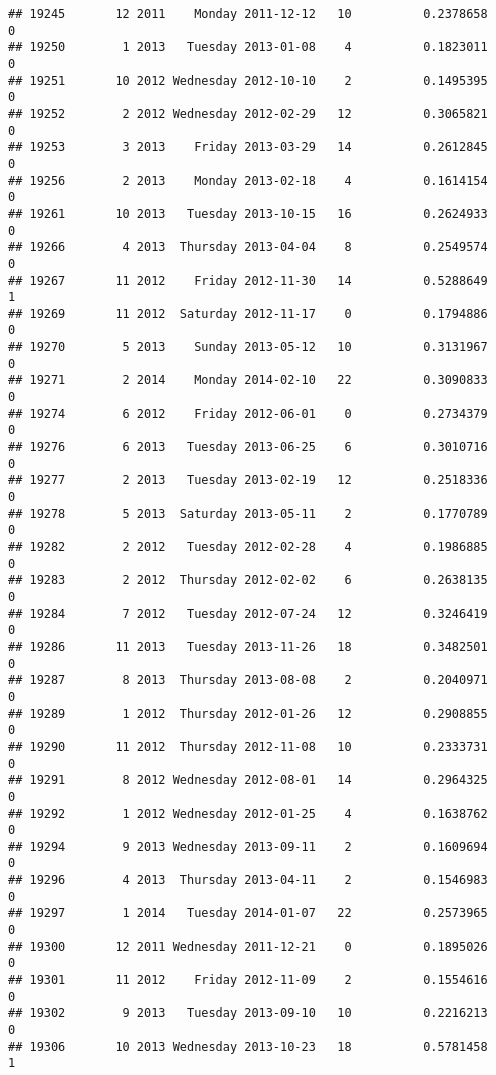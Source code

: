 \documentclass[
]{article}
\begin{document}
\begin{verbatim}
## 19245       12 2011    Monday 2011-12-12   10          0.2378658             0
## 19250        1 2013   Tuesday 2013-01-08    4          0.1823011             0
## 19251       10 2012 Wednesday 2012-10-10    2          0.1495395             0
## 19252        2 2012 Wednesday 2012-02-29   12          0.3065821             0
## 19253        3 2013    Friday 2013-03-29   14          0.2612845             0
## 19256        2 2013    Monday 2013-02-18    4          0.1614154             0
## 19261       10 2013   Tuesday 2013-10-15   16          0.2624933             0
## 19266        4 2013  Thursday 2013-04-04    8          0.2549574             0
## 19267       11 2012    Friday 2012-11-30   14          0.5288649             1
## 19269       11 2012  Saturday 2012-11-17    0          0.1794886             0
## 19270        5 2013    Sunday 2013-05-12   10          0.3131967             0
## 19271        2 2014    Monday 2014-02-10   22          0.3090833             0
## 19274        6 2012    Friday 2012-06-01    0          0.2734379             0
## 19276        6 2013   Tuesday 2013-06-25    6          0.3010716             0
## 19277        2 2013   Tuesday 2013-02-19   12          0.2518336             0
## 19278        5 2013  Saturday 2013-05-11    2          0.1770789             0
## 19282        2 2012   Tuesday 2012-02-28    4          0.1986885             0
## 19283        2 2012  Thursday 2012-02-02    6          0.2638135             0
## 19284        7 2012   Tuesday 2012-07-24   12          0.3246419             0
## 19286       11 2013   Tuesday 2013-11-26   18          0.3482501             0
## 19287        8 2013  Thursday 2013-08-08    2          0.2040971             0
## 19289        1 2012  Thursday 2012-01-26   12          0.2908855             0
## 19290       11 2012  Thursday 2012-11-08   10          0.2333731             0
## 19291        8 2012 Wednesday 2012-08-01   14          0.2964325             0
## 19292        1 2012 Wednesday 2012-01-25    4          0.1638762             0
## 19294        9 2013 Wednesday 2013-09-11    2          0.1609694             0
## 19296        4 2013  Thursday 2013-04-11    2          0.1546983             0
## 19297        1 2014   Tuesday 2014-01-07   22          0.2573965             0
## 19300       12 2011 Wednesday 2011-12-21    0          0.1895026             0
## 19301       11 2012    Friday 2012-11-09    2          0.1554616             0
## 19302        9 2013   Tuesday 2013-09-10   10          0.2216213             0
## 19306       10 2013 Wednesday 2013-10-23   18          0.5781458             1

\end{verbatim}
\end{document}
